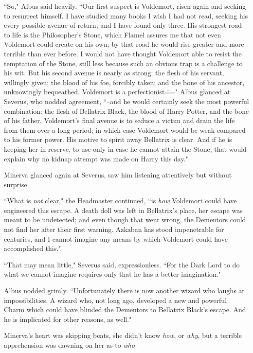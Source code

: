 ``So," Albus said heavily. ``Our first suspect is Voldemort, risen again and seeking to resurrect himself. I have studied many books I wish I had not read, seeking his every possible avenue of return, and I have found only three. His strongest road to life is the Philosopher's Stone, which Flamel assures me that not even Voldemort could create on his own; by that road he would rise greater and more terrible than ever before. I would not have thought Voldemort able to resist the temptation of the Stone, still less because such an obvious trap is a challenge to his wit. But his second avenue is nearly as strong: the flesh of his servant, willingly given; the blood of his foe, forcibly taken; and the bone of his ancestor, unknowingly bequeathed. Voldemort is a perfectionist\===" Albus glanced at Severus, who nodded agreement, ``\---and he would certainly seek the most powerful combination: the flesh of Bellatrix Black, the blood of Harry Potter, and the bone of his father. Voldemort's final avenue is to seduce a victim and drain the life from them over a long period; in which case Voldemort would be weak compared to his former power. His motive to spirit away Bellatrix is clear. And if he is keeping her in reserve, to use only in case he cannot attain the Stone, that would explain why no kidnap attempt was made on Harry this day."

Minerva glanced again at Severus, saw him listening attentively but without surprise.

``What is \emph{not} clear," the Headmaster continued, ``is \emph{how} Voldemort could have engineered this escape. A death doll was left in Bellatrix's place, her escape was meant to be undetected; and even though that went wrong, the Dementors could not find her after their first warning. Azkaban has stood impenetrable for centuries, and I cannot imagine any means by which Voldemort could have accomplished this."

``That may mean little," Severus said, expressionless. ``For the Dark Lord to do what we cannot imagine requires only that he has a better imagination."

Albus nodded grimly. ``Unfortunately there is now another wizard who laughs at impossibilities. A wizard who, not long ago, developed a new and powerful Charm which could have blinded the Dementors to Bellatrix Black's escape. And he is implicated for other reasons, as well."

Minerva's heart was skipping beats, she didn't know \emph{how}, or \emph{why}, but a terrible apprehension was dawning on her as to \emph{who\---}

